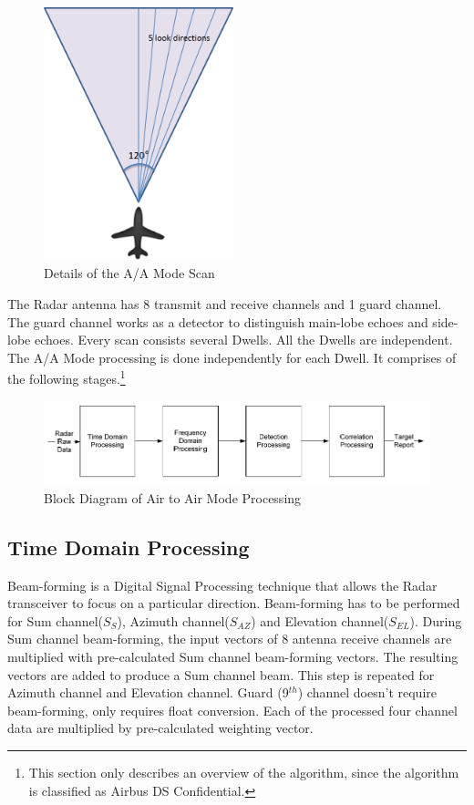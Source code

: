 \begin{figure}[h!]
	\centering
	\includegraphics[width=55mm]{figures/look_dir}
	\caption{Details of the A/A Mode Scan}
	\label{fig:bg_related_work:aa_look_dir}
\end{figure}

The Radar antenna has 8 transmit and receive channels and 1 guard channel. The guard channel works as a detector to distinguish main-lobe echoes and side-lobe echoes. Every scan consists several Dwells. All the Dwells are independent. The A/A Mode processing is done independently for each Dwell. It comprises of the following stages.\footnote{This section only describes an overview of the algorithm, since the algorithm is classified as Airbus DS Confidential.}

\begin{figure}[h!]
	\centering
	\includegraphics[width=160mm]{figures/aa_block_dia}
	\caption{Block Diagram of Air to Air Mode Processing}
	\label{fig:bg_related_work:aa_block_dia}
\end{figure}

\subsection{Time Domain Processing}
Beam-forming is a Digital Signal Processing technique that allows the Radar transceiver to focus on a particular direction. Beam-forming has to be performed for Sum channel($S_{S}$), Azimuth channel($S_{AZ}$) and Elevation channel($S_{EL}$). During Sum channel beam-forming, the input vectors of 8 antenna receive channels are multiplied with pre-calculated Sum channel beam-forming vectors. The resulting vectors are added to produce a Sum channel beam. This step is repeated for Azimuth channel and Elevation channel. Guard (9$^{th}$) channel doesn't require beam-forming, only requires float conversion. Each of the processed four channel data are multiplied by pre-calculated weighting vector. 

